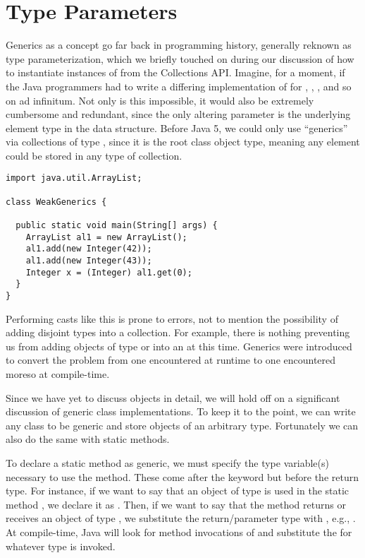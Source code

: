 \section{Type Parameters}

Generics as a concept go far back in programming history, generally reknown as type parameterization, which we briefly touched on during our discussion of how to instantiate instances of  from the Collections API. Imagine, for a moment, if the Java programmers had to write a differing implementation of  for , , , and so on ad infinitum. Not only is this impossible, it would also be extremely cumbersome and redundant, since the only altering parameter is the underlying element type in the data structure. Before Java 5, we could only use ``generics'' via collections of type , since it is the root class object type, meaning any element could be stored in any type of collection.

\begin{lstlisting}[language=MyJava]
import java.util.ArrayList;

class WeakGenerics {

  public static void main(String[] args) {
    ArrayList al1 = new ArrayList();
    al1.add(new Integer(42));
    al1.add(new Integer(43));
    Integer x = (Integer) al1.get(0);
  }
}
\end{lstlisting}

Performing casts like this is prone to errors, not to mention the possibility of adding disjoint types into a collection. For example, there is nothing preventing us from adding objects of type  or  into an  at this time. Generics were introduced to convert the problem from one encountered at runtime to one encountered moreso at compile-time. 

Since we have yet to discuss objects in detail, we will hold off on a significant discussion of generic class implementations. To keep it to the point, we can write any class to be generic and store objects of an arbitrary type. Fortunately we can also do the same with static methods. 

To declare a static method as generic, we must specify the type variable(s) necessary to use the method. These come after the  keyword but before the return type. For instance, if we want to say that an object of type  is used in the static method , we declare it as . Then, if we want to say that the method returns or receives an object of type , we substitute the return/parameter type with , e.g., . At compile-time, Java will look for method invocations of  and substitute the  for whatever type  is invoked. 


